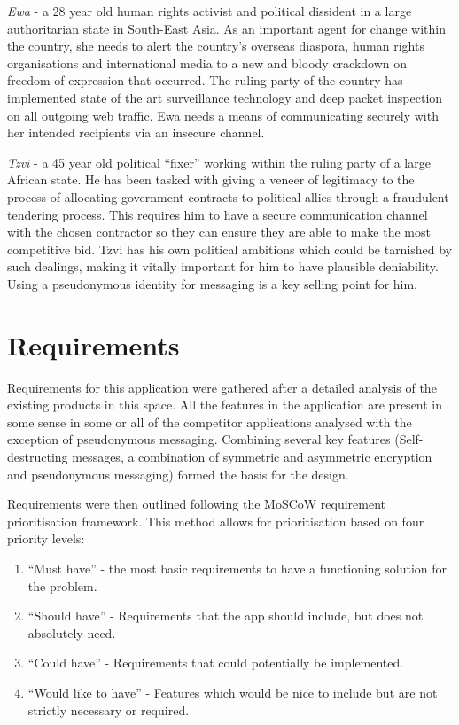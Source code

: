 \documentclass{mproj}
\begin{document}
\emph{Ewa} - a 28 year old human rights activist and political dissident in a large authoritarian state in South-East Asia. As an important agent for change within the country, she needs to alert the country's overseas diaspora, human rights organisations and international media to a new and bloody crackdown on freedom of expression that occurred. The ruling party of the country has implemented state of the art surveillance technology and deep packet inspection on all outgoing web traffic. Ewa needs a means of communicating securely with her intended recipients via an insecure channel. 

\emph{Tzvi} - a 45 year old political ``fixer'' working within the ruling party of a large African state. He has been tasked with giving a veneer of legitimacy to the process of allocating government contracts to political allies through a fraudulent tendering process. This requires him to have a secure communication channel with the chosen contractor so they can ensure they are able to make the most competitive bid. Tzvi has his own political ambitions which could be tarnished by such dealings, making it vitally important for him to have plausible deniability. Using a pseudonymous identity for messaging is a key selling point for him.

\section{Requirements}
Requirements for this application were gathered after a detailed analysis of the existing products in this space. All the features in the application are present in some sense in some or all of the competitor applications analysed with the exception of pseudonymous messaging. Combining several key features (Self-destructing messages, a combination of symmetric and asymmetric encryption and pseudonymous messaging) formed the basis for the design. 

Requirements were then outlined following the MoSCoW requirement prioritisation framework\cite{haughey2011moscow}. This method allows for prioritisation based on four priority levels: 
\begin{enumerate}
	\item ``Must have'' - the most basic requirements to have a functioning solution for the problem. 
	\item ``Should have'' - Requirements that the app should include, but does not absolutely need.
	\item ``Could have'' - Requirements that could potentially be implemented.
	\item ``Would like to have'' - Features which would be nice to include but are not strictly necessary or required.
\end{enumerate}
\end{document}
